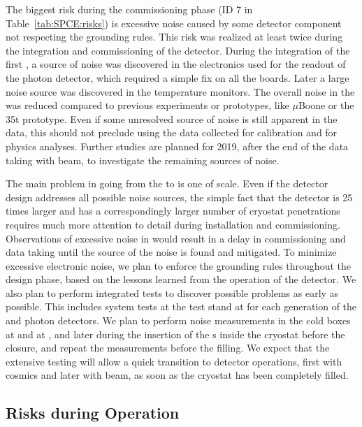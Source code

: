 The biggest risk during the commissioning phase
(ID 7 in Table~\ref{tab:SPCE:risks}) is excessive noise 
caused by some detector component not respecting the  grounding
rules. This risk was realized at least twice during the 
integration and commissioning of the  detector. During the 
integration of the first , a source of noise was discovered 
in the electronics used for the readout of the photon  detector, which 
required a simple fix on all the boards. Later a large noise source was 
discovered in the temperature monitors. The overall noise in the  
was reduced compared to previous  experiments or prototypes, 
like $\mu$Boone or the 35t prototype. Even if some unresolved source of noise 
is still apparent in the  data, this should not preclude using the data collected for calibration and for 
physics analyses. Further studies are planned for 2019, after the end of the 
data taking with beam, to investigate the remaining sources of noise.

The main problem in going from the  to  is one of scale.
Even if the detector design addresses all possible noise sources, the simple
fact that the detector is 25 times larger and has a correspondingly larger
number of cryostat penetrations requires much more attention to detail
during installation and commissioning. Observations of excessive 
noise in  would result in a delay in commissioning and  
data taking until the source of the noise is found and mitigated. To minimize excessive 
electronic noise, we plan to enforce the grounding  rules throughout the 
design phase, based on the lessons learned from the operation of the 
 detector. We also plan to perform  integrated tests to discover 
possible problems as early as possible. This includes system tests at the  test stand at  for each generation 
of the  and photon detectors. We plan to perform noise 
measurements in the cold boxes at  and at , and later 
during the insertion of the s inside the cryostat before the 
 closure, and repeat the measurements before the  filling. 
We expect that the extensive testing will allow a quick transition to 
detector operations, first with cosmics and later with beam, as soon as the 
cryostat has been completely filled. 

\subsection{Risks during Operation}
\label{sec:fdsp-tpcelec-risks-operations}


